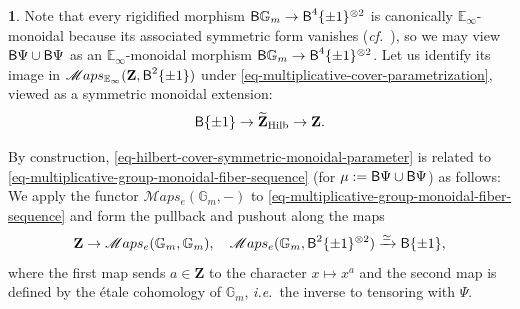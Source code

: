 \documentclass[10pt,english,reqno]{amsart}
\newcommand{\integers}{\mathbf Z}
\newcommand{\SMaps}{\mathscr{M}aps}
\newcommand{\deloop}{\textnormal{\textsf{B}}}
\newcommand{\Hilbert}{\mathrm{Hilb}}
\theoremstyle{definition}
\numberwithin{equation}{section}
\newtheorem{untitledsubsubsection}[subsubsection]{}
\newenvironment{void}
{\begin{untitledsubsubsection}}
{\end{untitledsubsubsection}}
\begin{document}

\begin{void}
\label{void-hilbert-cover-symmetric-monoidal-parameter}
Note that every rigidified morphism $\deloop\mathbb G_m \rightarrow \deloop^4\{\pm 1\}^{\otimes 2}$ is canonically $\mathbb E_{\infty}$-monoidal because its associated symmetric form vanishes (\emph{cf.}~\cite[Proposition 4.6.2]{zhao2022metaplectic}), so we may view $\deloop\Psi\cup \deloop\Psi$ as an $\mathbb E_{\infty}$-monoidal morphism $\deloop\mathbb G_m \rightarrow \deloop^4\{\pm 1\}^{\otimes 2}$. Let us identify its image in $\SMaps_{\mathbb E_{\infty}}(\integers, \deloop^2\{\pm 1\})$ under \eqref{eq-multiplicative-cover-parametrization}, viewed as a symmetric monoidal extension:
\begin{equation}
\label{eq-hilbert-cover-symmetric-monoidal-parameter}
\deloop\{\pm 1\} \rightarrow \widetilde{\integers}_{\Hilbert} \rightarrow \integers.
\end{equation}

By construction, \eqref{eq-hilbert-cover-symmetric-monoidal-parameter} is related to \eqref{eq-multiplicative-group-monoidal-fiber-sequence} (for $\mu := \deloop\Psi\cup \deloop\Psi$) as follows: We apply the functor $\SMaps_e(\mathbb G_m, -)$ to \eqref{eq-multiplicative-group-monoidal-fiber-sequence} and form the pullback and pushout along the maps
$$
\integers \rightarrow \SMaps_e(\mathbb G_m, \mathbb G_m),\quad \SMaps_e(\mathbb G_m, \deloop^2\{\pm 1\}^{\otimes 2}) \xrightarrow{\simeq} \deloop\{\pm 1\},
$$
where the first map sends $a \in \integers$ to the character $x\mapsto x^a$ and the second map is defined by the \'etale cohomology of $\mathbb G_m$, \emph{i.e.}~the inverse to tensoring with $\Psi$.
\end{void}

\end{document}
